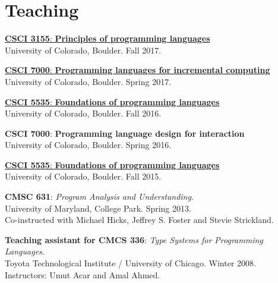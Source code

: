\documentclass[10pt,letterpaper]{article}
\renewenvironment{itemize}{
  \begin{list}{}{
    \setlength{\leftmargin}{1.5em}
    \setlength{\itemsep}{0.25em}
    \setlength{\parskip}{0pt}
    \setlength{\parsep}{0.25em}
  }
}{
  \end{list}
}
\begin{document}
\section*{Teaching}

\begin{itemize}

\item {
  \href{http://csci3155.cs.colorado.edu/f17/}
  {\textbf{CSCI 3155}: \textbf{Principles of programming languages}}
  \\
  University of Colorado, Boulder.  Fall 2017.
}

\item {
  \href{http://matthewhammer.org/courses/csci7000-s17}
  {\textbf{CSCI 7000}: \textbf{Programming languages for incremental computing}}
  \\
  University of Colorado, Boulder.  Spring 2017.  
}

\item {
  \href{http://matthewhammer.org/courses/csci5535-f16}
  {\textbf{CSCI 5535}: \textbf{Foundations of programming languages}}
  \\
  University of Colorado, Boulder.  Fall 2016. 
}

\item {
  \textbf{CSCI 7000}: \textbf{Programming language design for interaction}
  \\
  University of Colorado, Boulder.  Spring 2016.  
}

\item {
  \href{https://www.cs.colorado.edu/~maha2973/csci5535/f15/}
  {\textbf{CSCI 5535}: \textbf{Foundations of programming languages}}
  \\
  University of Colorado, Boulder.  Fall 2015.  
}

  
\item {
  \textbf{CMSC 631}: \textit{Program Analysis and Understanding}.
  \\
  University of Maryland, College Park.  Spring 2013.
  \\
  Co-instructed with Michael Hicks, Jeffrey S. Foster and Stevie Strickland.
}

\item { 
  \textbf{Teaching assistant for CMCS 336}: \textit{Type Systems for Programming Languages}.
  \\
  Toyota Technological Institute / University of Chicago.  Winter 2008.
  \\
  Instructors: Umut Acar and Amal Ahmed.
}
\end{itemize}
\end{document}

